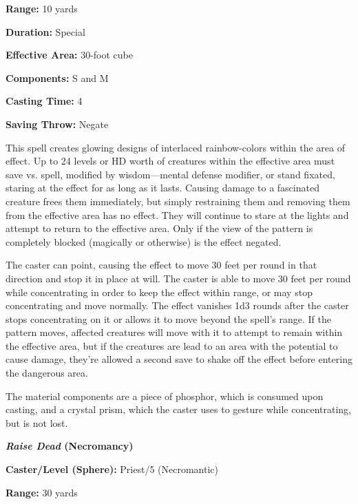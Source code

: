 \begin{multicols}{2}
\begin{minipage}{\columnwidth}
\noindent \textbf{Range:} 10 yards

\noindent \textbf{Duration:} Special

\noindent \textbf{Effective Area:} 30-foot cube

\noindent \textbf{Components:} S and M

\noindent \textbf{Casting Time:} 4

\noindent \textbf{Saving Throw:} Negate

\end{minipage}

This spell creates glowing designs of interlaced rainbow-colors within the area of effect.  Up to 24 levels or HD worth of creatures within the effective area must save vs. spell, modified by wisdom---mental defense modifier, or stand fixated, staring at the effect for as long as it lasts.  Causing damage to a fascinated creature frees them immediately, but simply restraining them and removing them from the effective area has no effect.  They will continue to stare at the lights and attempt to return to the effective area.  Only if the view of the pattern is completely blocked (magically or otherwise) is the effect negated.

The caster can point, causing the effect to move 30 feet per round in that direction and stop it in place at will.  The caster is able to move 30 feet per round while concentrating in order to keep the effect within range, or may stop concentrating and move normally.  The effect vanishes 1d3 rounds after the caster stops concentrating on it or allows it to move beyond the spell's range.  If the pattern moves, affected creatures will move with it to attempt to remain within the effective area, but if the creatures are lead to an area with the potential to cause damage, they're allowed a second save to shake off the effect before entering the dangerous area.  

The material components are a piece of phosphor, which is consumed upon casting, and a crystal prism, which the caster uses to gesture while concentrating, but is not lost.

\vspace{1em}

\noindent
\begin{minipage}{\columnwidth}

\noindent \textbf{\textit{Raise Dead} (Necromancy)}

\noindent \textbf{Caster/Level (Sphere):} Priest/5 (Necromantic)

\noindent \textbf{Range:} 30 yards


\end{minipage}
\end{multicols}
